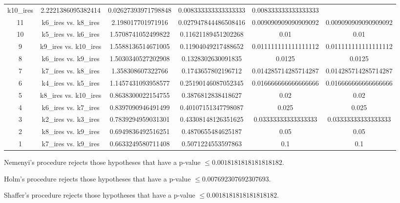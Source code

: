 \documentclass[a4paper,10pt]{article}
\begin{document}
\begin{landscape}
\begin{table}[!htp]
\begin{tabular}{cccccc}
k10_ires&2.2221386095382414&0.02627393971798848&0.008333333333333333&0.008333333333333333\\11&k6_ires vs. k8_ires&2.198017701971916&0.027947844486508416&0.009090909090909092&0.009090909090909092\\10&k5_ires vs. k6_ires&1.5708741052499822&0.11621189451202268&0.01&0.01\\9&k9_ires vs. k10_ires&1.5588136514671005&0.11904049217488652&0.011111111111111112&0.011111111111111112\\8&k6_ires vs. k9_ires&1.5030340527202908&0.1328302630091835&0.0125&0.0125\\7&k7_ires vs. k8_ires&1.358308607322766&0.1743657802196712&0.014285714285714287&0.014285714285714287\\6&k4_ires vs. k5_ires&1.1457431093958577&0.25190146087052345&0.016666666666666666&0.016666666666666666\\5&k8_ires vs. k10_ires&0.8638300022154755&0.3876812838418627&0.02&0.02\\4&k6_ires vs. k7_ires&0.8397090946491499&0.40107151347798087&0.025&0.025\\3&k2_ires vs. k3_ires&0.7839294959031301&0.43308148126351625&0.03333333333333333&0.03333333333333333\\2&k8_ires vs. k9_ires&0.6949836492516251&0.4870655484625187&0.05&0.05\\1&k7_ires vs. k9_ires&0.6633249580711408&0.5071224553597863&0.1&0.1\\\hline
\end{tabular}
\end{table}
Nemenyi's procedure rejects those hypotheses that have a p-value $\le0.0018181818181818182$.


Holm's procedure rejects those hypotheses that have a p-value $\le0.007692307692307693$.


Shaffer's procedure rejects those hypotheses that have a p-value $\le0.0018181818181818182$.



\end{landscape}
\end{document}
